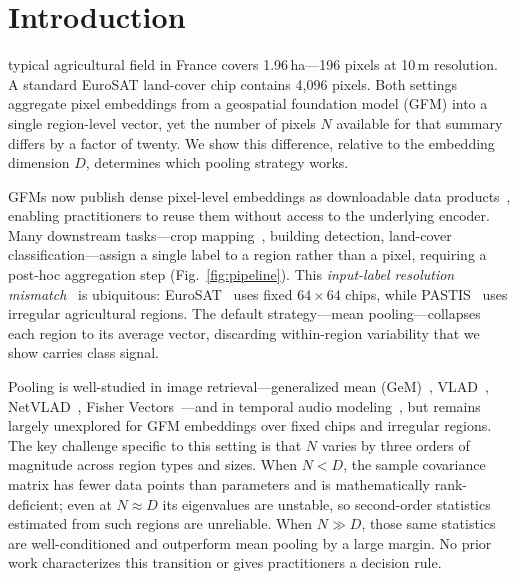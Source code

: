 \documentclass[journal]{IEEEtran}
\begin{document}
\section{Introduction}
 typical agricultural field in France covers 1.96\,ha---196 pixels at 10\,m resolution. A standard EuroSAT land-cover chip contains 4{,}096 pixels. Both settings aggregate pixel embeddings from a geospatial foundation model (GFM) into a single region-level vector, yet the number of pixels $N$ available for that summary differs by a factor of twenty. We show this difference, relative to the embedding dimension $D$, determines which pooling strategy works.

GFMs now publish dense pixel-level embeddings as downloadable data products~\cite{fang2026earthembeddingsproductstaxonomy,jakubik2023prithvi,cong2022satmae,bastani2023satlaspretrain,corley2025landsatbench}, enabling practitioners to reuse them without access to the underlying encoder. Many downstream tasks---crop mapping~\cite{kerner2025ftw,corley2025ftwprue,corley2025globalftw}, building detection, land-cover classification---assign a single label to a region rather than a pixel, requiring a post-hoc aggregation step (Fig.~\ref{fig:pipeline}). This \textit{input-label resolution mismatch}~\cite{workman2023handling} is ubiquitous: EuroSAT~\cite{helber2019eurosat} uses fixed $64{\times}64$ chips, while PASTIS~\cite{garnot2021panoptic} uses irregular agricultural regions. The default strategy---mean pooling---collapses each region to its average vector, discarding within-region variability that we show carries class signal.

Pooling is well-studied in image retrieval---generalized mean (GeM)~\cite{radenovic2018gem}, VLAD~\cite{jegou2010vlad}, NetVLAD~\cite{arandjelovic2016netvlad}, Fisher Vectors~\cite{perronnin2010improving}---and in temporal audio modeling~\cite{miech2017learnable}, but remains largely unexplored for GFM embeddings over fixed chips and irregular regions. The key challenge specific to this setting is that $N$ varies by three orders of magnitude across region types and sizes. When $N < D$, the sample covariance matrix has fewer data points than parameters and is mathematically rank-deficient; even at $N \approx D$ its eigenvalues are unstable, so second-order statistics estimated from such regions are unreliable. When $N \gg D$, those same statistics are well-conditioned and outperform mean pooling by a large margin. No prior work characterizes this transition or gives practitioners a decision rule.
\end{document}
